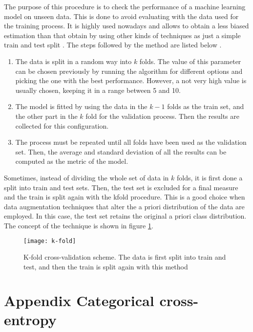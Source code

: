 	The purpose of this procedure is to check the performance of a machine learning model on unseen data. This is done to avoid evaluating with the data used for the training process. It is highly used nowadays and allows to obtain a less biased estimation than that obtain by using other kinds of techniques as just a simple train and test split \cite{Browniee2018}. The steps followed by the method are listed below \cite{M2018}.
	
	\begin{enumerate}
		\item The data is split in a random way into $k$ folds. The value of this parameter can be chosen previously by running the algorithm for different options and picking the one with the best performance. However, a not very high value is usually chosen, keeping it in a range between 5 and 10.
		\item The model is fitted by using the data in the $k - 1$ folds as the train set, and the other part in the $k$ fold for the validation process. Then the results are collected for this configuration.
		\item The process must be repeated until all folds have been used as the validation set. Then, the average and standard deviation of all the results can be computed as the metric of the model. 
	\end{enumerate}

	Sometimes, instead of dividing the whole set of data in $k$ folds, it is first done a split into train and test sets. Then, the test set is excluded for a final measure and the train is split again with the \acrlong{kfold} procedure. This is a good choice when data augmentation techniques that alter the a priori distribution of the data are employed. In this case, the test set retains the original a priori class distribution. The concept of the technique is shown in figure \ref{fig:mesh16}.
	
	\begin{figure}[H]
		\centering
		\captionsetup{justification=centering}
		\texttt{[image: k-fold]}
		\caption{K-fold cross-validation scheme. The data is first split into train and test, and then the train is split again with this method \cite{Scikit-learna}}
		\label{fig:mesh16}
	\end{figure}

\chapter{Appendix Categorical cross-entropy}
\label{appendix:categorical-cross-entropy}

